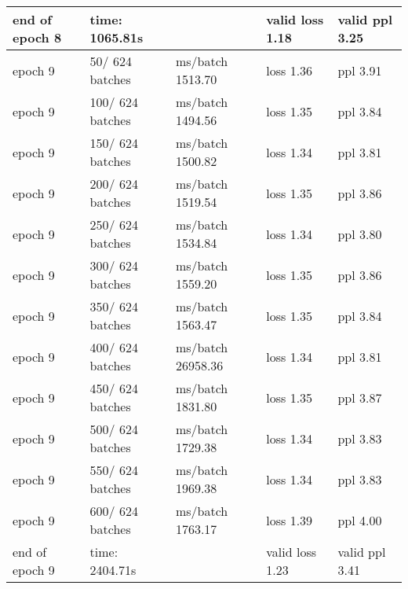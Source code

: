 \begin{center}
\begin{tabular}{ | m{3cm} | m{3cm}| m{4cm} | m{3cm} | m{3cm} | }
end of epoch   8 & time: 1065.81s && valid loss  1.18 & valid ppl     3.25
\\ 
\hline
epoch   9 &    50/  624 batches & ms/batch 1513.70 & loss  1.36 & ppl     3.91\\ 
\hline
epoch   9 &   100/  624 batches & ms/batch 1494.56 & loss  1.35 & ppl     3.84\\ 
\hline
epoch   9 &   150/  624 batches & ms/batch 1500.82 & loss  1.34 & ppl     3.81\\ 
\hline
epoch   9 &   200/  624 batches & ms/batch 1519.54 & loss  1.35 & ppl     3.86\\ 
\hline
epoch   9 &   250/  624 batches & ms/batch 1534.84 & loss  1.34 & ppl     3.80\\ 
\hline
epoch   9 &   300/  624 batches & ms/batch 1559.20 & loss  1.35 & ppl     3.86\\ 
\hline
epoch   9 &   350/  624 batches & ms/batch 1563.47 & loss  1.35 & ppl     3.84\\ 
\hline
epoch   9 &   400/  624 batches & ms/batch 26958.36 & loss  1.34 & ppl     3.81\\ 
\hline
epoch   9 &   450/  624 batches & ms/batch 1831.80 & loss  1.35 & ppl     3.87\\ 
\hline
epoch   9 &   500/  624 batches & ms/batch 1729.38 & loss  1.34 & ppl     3.83\\ 
\hline
epoch   9 &   550/  624 batches & ms/batch 1969.38 & loss  1.34 & ppl     3.83\\ 
\hline
epoch   9 &   600/  624 batches & ms/batch 1763.17 & loss  1.39 & ppl     4.00\\ 
\hline
end of epoch   9 & time: 2404.71s & &valid loss  1.23 & valid ppl     3.41
\hline
\end{tabular}
\end{center}


\\


